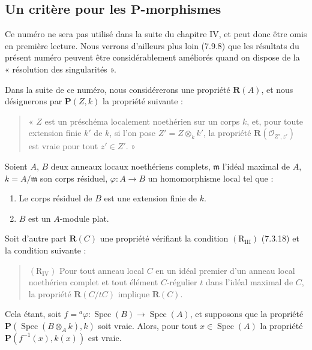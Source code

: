 \subsection{Un critère pour les $\boldsymbol P$-morphismes}
\label{subsection:IV.7.5-fr}

\begin{env}[7.5.0]
\label{IV.2.s7.5.0-fr}
Ce numéro ne sera pas utilisé dans la suite du chapitre IV, et peut donc être
omis en première lecture. Nous verrons d'ailleurs plus loin (7.9.8) que les
résultats du présent numéro peuvent être considérablement améliorés quand on
dispose de la « résolution des singularités ».

Dans la suite de ce numéro, nous considérerons une propriété
$\boldsymbol R(A)$, et nous désignerons par $\boldsymbol P(Z,k)$ la propriété
suivante :
\begin{quote}
« $Z$ est un préschéma localement noethérien sur un corps $k$, et, pour toute
extension finie $k'$ de $k$, si l'on pose $Z'=Z\otimes_k k'$, la propriété
$\boldsymbol R(\mathscr O_{Z',z'})$ est vraie pour tout $z'\in Z'$. »
\end{quote}
\end{env}

\begin{theorem}[7.5.1]
\label{IV.2.s7.5.1-fr}
Soient $A$, $B$ deux anneaux locaux noethériens complets, $\mathfrak m$
l'idéal maximal de $A$, $k=A/\mathfrak m$ son corps résiduel,
$\varphi:A\to B$ un homomorphisme local tel que :
\begin{enumerate}
\item[\emph{(i)}] Le corps résiduel de $B$ est une extension finie de $k$.
\item[\emph{(ii)}] $B$ est un $A$-module plat.
\end{enumerate}
Soit d'autre part $\boldsymbol R(C)$ une propriété vérifiant la condition
$(\mathrm R_{\mathrm{III}})$ (7.3.18) et la condition suivante :
\begin{quote}
$(\mathrm R_{\mathrm{IV}})$ Pour tout anneau local $C$ en un idéal premier
d'un anneau local noethérien complet et tout élément $C$-régulier $t$ dans
l'idéal maximal de $C$, la propriété $\boldsymbol R(C/tC)$ implique
$\boldsymbol R(C)$.
\end{quote}


Cela étant, soit $f={}^a\varphi:\operatorname{Spec}(B)\to
\operatorname{Spec}(A)$, et supposons que la propriété
$\boldsymbol P(\operatorname{Spec}(B\otimes_A k),k)$ soit vraie. Alors, pour
tout $x\in\operatorname{Spec}(A)$ la propriété
$\boldsymbol P(f^{-1}(x),k(x))$ est vraie.
\end{theorem}

